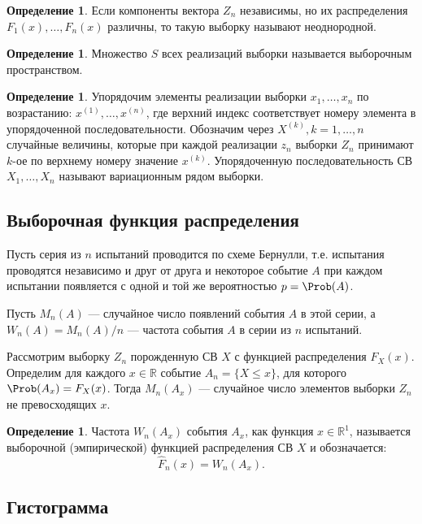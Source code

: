 \documentclass[12pt]{report}
\theoremstyle{definition}
\newtheorem{definition}[theorem]{Определение}
\newcommand{\R}{\mathbb R}
\begin{document}
\begin{definition}
Если компоненты вектора $Z_n$ независимы, но их распределения
$F_1(x),\dots, F_n(x)$ различны, то такую выборку называют неоднородной.
\end{definition}

\begin{definition}
Множество $S$ всех реализаций выборки называется выборочным пространством.
\end{definition}

\begin{definition}
Упорядочим элементы реализации выборки $x_1, \dots, x_n$ по возрастанию:
$x^{(1)}, \dots, x^{(n)}$, где верхний индекс соответствует номеру элемента
в упорядоченной последовательности. Обозначим через $X^{(k)}, k = 1, \dots, n$
случайные величины, которые при каждой реализации $z_n$ выборки $Z_n$ принимают
$k$-ое по верхнему номеру значение $x^{(k)}$. Упорядоченную последовательность
СВ $X_1, \dots, X_n$ называют вариационным рядом выборки.
\end{definition}

\subsection{Выборочная функция распределения}

Пусть серия из $n$ испытаний проводится по схеме Бернулли, т.е. испытания
проводятся независимо и друг от друга и некоторое событие $A$ при каждом
испытании появляется с одной и той же вероятностью $p = \Prob(A)$.

Пусть $M_n(A)$ --- случайное число появлений события $A$ в этой серии, а
$W_n(A) = M_n(A) / n$ --- частота события $A$ в серии из $n$ испытаний.

Рассмотрим выборку $Z_n$ порожденную СВ $X$ с функцией распределения $F_X(x)$.
Определим для каждого $x \in \R$ событие $A_n = \{X \le x\}$, для которого
$\Prob(A_x) = F_X(x)$. Тогда $M_n(A_x)$ --- случайное число элементов выборки
$Z_n$ не превосходящих $x$.


\begin{definition}
Частота $W_n(A_x)$ события $A_x$, как функция $x \in \R^1$, называется
выборочной (эмпирической) функцией распределения СВ $X$ и обозначается:
$$
\hat{F}_n(x) = W_n(A_x).
$$
\end{definition}

\subsection{Гистограмма}
\end{document}
